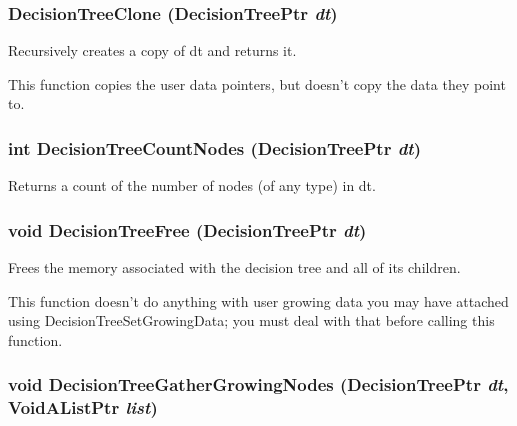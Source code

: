 \subsubsection{ Decision\-Tree\-Clone ({\bf Decision\-Tree\-Ptr} {\em dt})}\label{DecisionTree_8h_a8}


Recursively creates a copy of dt and returns it. 

This function copies the user data pointers, but doesn't copy the data they point to. 
\subsubsection{\setlength{\rightskip}{0pt plus 5cm}int Decision\-Tree\-Count\-Nodes ({\bf Decision\-Tree\-Ptr} {\em dt})}\label{DecisionTree_8h_a29}


Returns a count of the number of nodes (of any type) in dt. 

\subsubsection{\setlength{\rightskip}{0pt plus 5cm}void Decision\-Tree\-Free ({\bf Decision\-Tree\-Ptr} {\em dt})}\label{DecisionTree_8h_a7}


Frees the memory associated with the decision tree and all of its children. 

This function doesn't do anything with user growing data you may have attached using Decision\-Tree\-Set\-Growing\-Data; you must deal with that before calling this function. 
\subsubsection{\setlength{\rightskip}{0pt plus 5cm}void Decision\-Tree\-Gather\-Growing\-Nodes ({\bf Decision\-Tree\-Ptr} {\em dt}, Void\-AList\-Ptr {\em list})}\label{DecisionTree_8h_a27}


